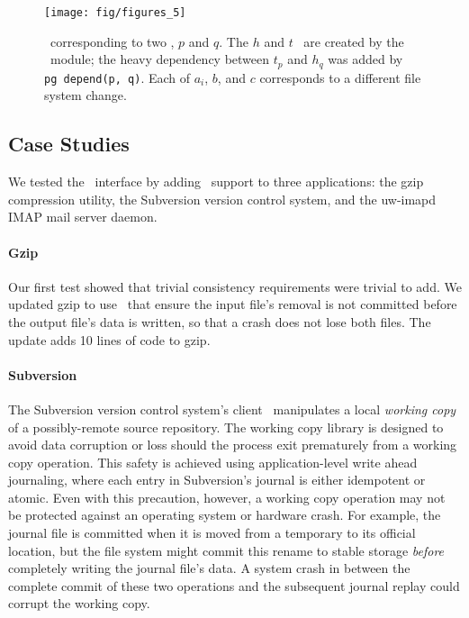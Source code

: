 \begin{figure}[t]
\centering
\texttt{[image: fig/figures\_5]}
\caption{\label{fig:patchgroup-patches} \Patches\ corresponding to two
  \patchgroups, $p$ and $q$.  The $h$ and $t$ \patches\ are created by the 
  \patchgroup\ module; the heavy dependency between $t_p$ and $h_q$ was added
  by \texttt{pg~depend(p, q)}.  Each of $a_i$, $b$, and $c$ corresponds to
  a different file system change.}
\end{figure}

\subsection{Case Studies}
\label{sec:patchgroup:casestudies}


We tested the \patchgroup\ interface by adding \patchgroup\ support to three
applications: the gzip compression utility, the Subversion version control
system, and the uw-imapd IMAP mail server daemon.

\paragraph{Gzip}
\label{sec:patchgroup:gzip}

Our first test showed that trivial consistency requirements were trivial to
add.  We updated gzip to use \patchgroups\ that ensure the input file's
removal is not committed before the output file's data is written, so that
a crash does not lose both files. The update adds 10 lines of code to gzip.

\paragraph{Subversion}
\label{sec:patchgroup:svn}

The Subversion version control system's client~\cite{svn} manipulates a
local \emph{working copy} of a possibly-remote source repository.
%
The working copy library is designed to avoid data corruption or loss
should the process exit prematurely from a working copy operation.
%
This safety is achieved using application-level write ahead journaling,
where each entry in Subversion's journal is either idempotent or
atomic.
%
Even with this precaution, however, a working copy operation may not be
protected against an operating system or hardware crash.
%
For example, the journal file is committed when it is moved from a
temporary to its official location, but the file system might commit this
rename to stable storage \emph{before} completely writing the journal
file's data.
%
A system crash in between the complete commit of these two operations
and the subsequent journal replay could corrupt the working copy.

